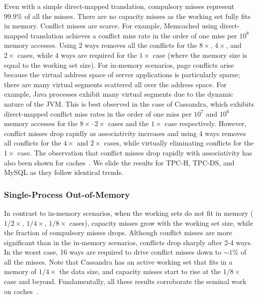 Even with a simple direct-mapped translation, compulsory misses represent $99.9\%$ of all the misses. There are no capacity misses as the working set fully fits in memory. Conflict misses are scarce. For example, Memcached using direct-mapped translation achieves a conflict miss rate in the order of one miss per $10^{8}$ memory accesses. Using $2$ ways removes all the conflicts for the $8\times$, $4\times$, and $2\times$ cases, while $4$ ways are required for the $1\times$ case (where the memory size is equal to the working set size). For in-memory scenarios, page conflicts arise because the virtual address space of server applications is particularly sparse; there are many virtual segments scattered all over the address space. For example, Java processes exhibit many virtual segments due to the dynamic nature of the JVM. This is best observed in the case of Cassandra, which exhibits direct-mapped conflict miss rates in the order of one miss per $10^{7}$ and $10^{6}$ memory accesses for the $8\times$--$2\times$ cases and the $1\times$ case respectively. However, conflict misses drop rapidly as associativity increases and using 4 ways removes all conflicts for the $4\times$ and $2\times$ cases, while virtually eliminating conflicts for the $1\times$ case. The observation that conflict misses drop rapidly with associativity has also been shown for caches~\cite{hill:aspects, cantin:cache}. We elide the results for TPC-H, TPC-DS, and MySQL as they follow identical trends.

\subsubsection{Single-Process Out-of-Memory}

In contrast to in-memory scenarios, when the working sets do not fit in memory ($1/2\times$, $1/4\times$, $1/8\times$ cases), capacity misses grow with the working set size, while the fraction of compulsory misses drops. Although conflict misses are more significant than in the in-memory scenarios, conflicts drop sharply after 2-4 ways. In the worst case, 16 ways are required to drive conflict misses down to $\sim1\%$ of all the misses. Note that Cassandra has an active working set that fits in a memory of $1/4\times$ the data size, and capacity misses start to rise at the $1/8\times$ case and beyond. Fundamentally, all these results corroborate the seminal work on caches~\cite{hill:aspects, cantin:cache}. 

